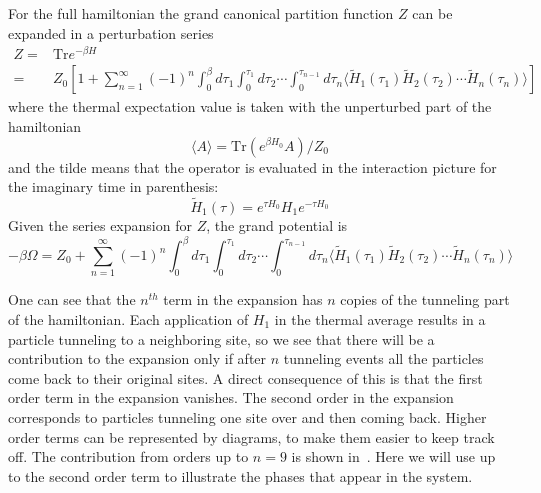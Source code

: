 \documentclass[11pt,letter]{article}
\begin{document}
For the full hamiltonian the grand canonical partition function $Z$ can be
expanded in a perturbation series~\cite{Henderson1992} 
\begin{equation}
\begin{split}
  Z = & \text{Tr} e^{-\beta H}  \\
    = & Z_{0} \left[ 1 + 
        \sum_{n=1}^{\infty} (-1)^{n} 
        \int_{0}^{\beta} d\tau_{1} \int_{0}^{\tau_{1}} d\tau_{2} 
        \dotsm \int_{0}^{\tau_{n-1}} d\tau_{n} 
        \langle
              \tilde{H}_{1}(\tau_{1}) 
              \tilde{H}_{2}(\tau_{2})  \dotsm
              \tilde{H}_{n}(\tau_{n})  \rangle 
              \right] 
\end{split}
\end{equation} 
where the thermal expectation value is taken with the
unperturbed part of the hamiltonian
\begin{equation}
\langle A \rangle = \text{Tr} ( e^{\beta H_{0} } A ) / Z_{0} 
\end{equation}
and the tilde means that the operator is evaluated in the interaction picture
for the imaginary time in parenthesis: 
\begin{equation}
 \tilde{H}_{1}(\tau) = e^{\tau H_{0}} H_{1} e^{-\tau H_{0}} 
\end{equation}
Given the series expansion for $Z$, the grand potential is 
\begin{equation}
 -\beta \Omega = Z_{0} + 
        \sum_{n=1}^{\infty} (-1)^{n} 
        \int_{0}^{\beta} d\tau_{1} \int_{0}^{\tau_{1}} d\tau_{2} 
        \dotsm \int_{0}^{\tau_{n-1}} d\tau_{n} 
        \langle
              \tilde{H}_{1}(\tau_{1}) 
              \tilde{H}_{2}(\tau_{2})  \dotsm
              \tilde{H}_{n}(\tau_{n})  \rangle 
\end{equation}

One can see that the $n^{th}$ term in the expansion has $n$ copies of the
tunneling part of the hamiltonian.  Each  application of $H_{1}$ in the thermal
average results in a particle tunneling to a neighboring site, so we see that
there will be a contribution to the expansion only if after $n$ tunneling
events all the particles come back to their original sites.  A direct
consequence of this is that the first order term in the expansion vanishes.
The second order in the expansion corresponds to particles tunneling one site
over and then coming back.  Higher order terms can be represented by diagrams,
to make them easier to keep track off.  The contribution from orders up to
$n=9$ is shown in~\cite{Henderson1992}.  Here we will use up to the second
order term to illustrate the phases that appear in the system.  
\end{document}
